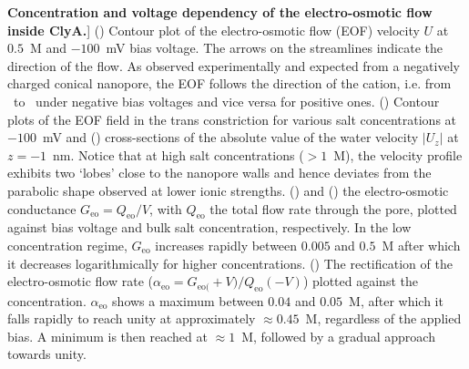 \begin{figure*}[!htb]
\caption
[\textbf{Concentration and voltage dependency of the electro-osmotic flow inside ClyA.}]
{
()
Contour plot of the electro-osmotic flow (EOF) velocity $U$ at $0.5$~M and $-100$~mV bias voltage. The arrows 
on the streamlines indicate the direction of the flow. As observed experimentally\cite{Soskine-2013} and 
expected from a negatively charged conical nanopore, the EOF follows the direction of the cation, i.e. from 
\cis\ to \trans\ under negative bias voltages and vice versa for positive ones.
()
Contour plots of the EOF field in the trans constriction for various salt concentrations at $-100$~mV and
()
cross-sections of the absolute value of the water velocity $\left|U_z\right|$ at $z=-1$~nm. Notice that at 
high salt concentrations ($>1$~M), the velocity profile exhibits two `lobes' close to the nanopore walls and 
hence deviates from the parabolic shape observed at lower ionic strengths.
() and () the 
electro-osmotic conductance $G_{\text{eo}} = Q_{\text{eo}}/V$, with $Q_{\text{eo}}$ the total flow rate 
through the pore, plotted against bias voltage and bulk salt concentration, respectively. In the low 
concentration regime, $G_{\text{eo}}$ increases rapidly between $0.005$ and $0.5$~M after which it decreases 
logarithmically for higher concentrations.
()
The rectification of the electro-osmotic flow rate
($\alpha_{\text{eo}} = G_{\text{eo}(}+V)/Q_{\text{eo}}(-V)$) plotted against the concentration. 
$\alpha_{\text{eo}}$ shows a maximum between $0.04$ and $0.05$~M, after which it falls rapidly to reach unity 
at approximately $\approx0.45$~M, regardless of the applied bias. A minimum is then reached at $\approx1$~M, 
followed by a gradual approach towards unity.
}

\label{fig:flow}

\end{figure*}